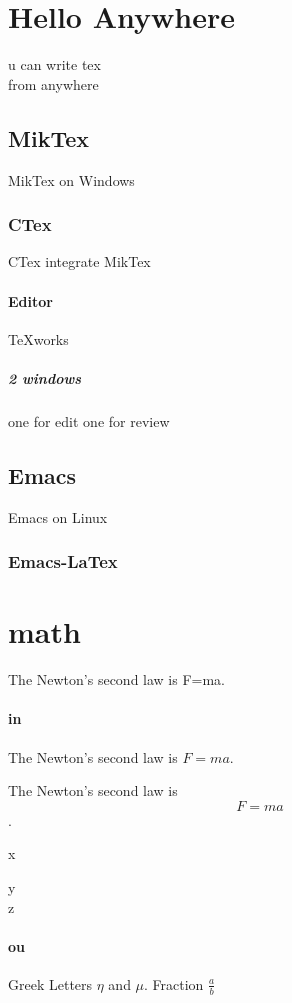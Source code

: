 \documentclass[a4paper,11pt]{book} %
\begin{document}
\section{Hello Anywhere} u can write tex\\ from anywhere
		\subsection{MikTex} MikTex on
Windows
			\subsubsection{CTex}CTex integrate MikTex
				\paragraph{Editor}TeXworks
					\subparagraph{2 windows}one for edit one for review
		\subsection{Emacs}Emacs on Linux
			\subsubsection{Emacs-LaTex}

	\section{math}The Newton's second law is F=ma. %

	\paragraph{in} The Newton's second law is $F=ma$. %

	The Newton's second law is \[F=ma\].  %

	x

	y\\
	z

	\paragraph{ou}
	Greek Letters $\eta$ and $\mu$.
	Fraction $\frac{a}{b}$
\end{document}
